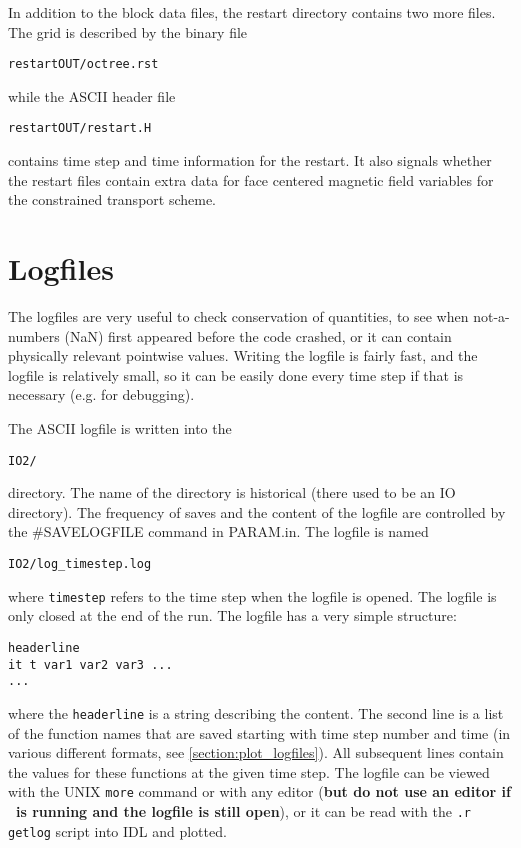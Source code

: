 In addition to the block data files, the restart directory contains two
more files. The grid is described by the binary file
\begin{verbatim}
restartOUT/octree.rst
\end{verbatim}
while the ASCII header file
\begin{verbatim}
restartOUT/restart.H
\end{verbatim}
contains time step and time information for the restart. It also signals
whether the restart files contain extra data for face centered 
magnetic field variables for the constrained transport scheme.

\section{Logfiles \label{section:logfiles}}

The logfiles are very useful to check conservation of quantities,
to see when not-a-numbers (NaN) first appeared before the code crashed,
or it can contain physically relevant pointwise values. Writing
the logfile is fairly fast, 
and the logfile is relatively small,
so it can be easily done every time step if that is necessary 
(e.g. for debugging).

The ASCII logfile is written into the 
\begin{verbatim}
IO2/
\end{verbatim}
directory. The name of the directory is historical 
(there used to be an IO directory).
The frequency of saves and the content of the logfile are controlled by
the \#SAVELOGFILE command in PARAM.in. The logfile is named 
\begin{verbatim}
IO2/log_timestep.log
\end{verbatim}
where {\tt timestep} refers to the time step when the logfile
is opened. The logfile is only closed at the end of the run.
The logfile has a very simple structure:
\begin{verbatim}
headerline
it t var1 var2 var3 ...
...
\end{verbatim}
where the {\tt headerline} is a string describing the content.
The second line is a list of the function names that are saved
starting with time step number and time (in various different formats, see
\ref{section:plot_logfiles}). 
All subsequent lines contain the values for these functions
at the given time step. The logfile can be viewed with the 
UNIX {\tt more} command or with any editor ({\bf but do not use an
editor if \BATSRUS\ is running and the logfile is still open}), 
or it can be read with the {\tt .r getlog} script into IDL and plotted.


